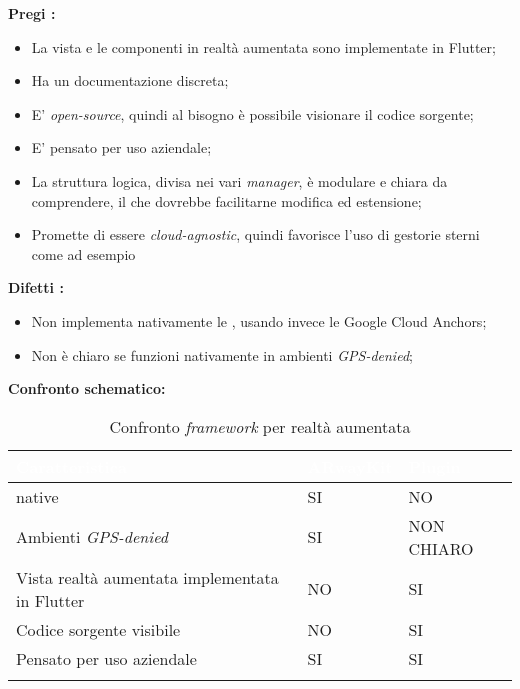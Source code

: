\textbf{Pregi \aplug{}:}
\begin{itemize}
  \item La vista e le componenti in realtà aumentata sono implementate in Flutter;
  \item Ha un documentazione discreta;
  \item E' \textit{open-source}, quindi al bisogno è possibile visionare il codice sorgente;
  \item E' pensato per uso aziendale;
  \item La struttura logica, divisa nei vari \textit{manager}, è modulare e chiara da comprendere, il che dovrebbe facilitarne modifica ed estensione;
  \item Promette di essere \textit{cloud-agnostic}, quindi favorisce l'uso di gestorie sterni come ad esempio \asa{} 
\end{itemize}

\textbf{Difetti \aplug{}:}
\begin{itemize}
  \item Non implementa nativamente le \asa{}, usando invece le Google Cloud Anchors;
  \item Non è chiaro se funzioni nativamente in ambienti \textit{GPS-denied};
\end{itemize}

\textbf{Confronto schematico:}

{
  \setlength{\freewidth}{\dimexpr\textwidth-10\tabcolsep}
  \renewcommand{\arraystretch}{1.5}
  \centering
  \setlength{\aboverulesep}{0pt}
  \setlength{\belowrulesep}{0pt}
  \begin{longtable}{C{.6\freewidth} C{.2\freewidth} C{.2\freewidth}} 
     \toprule 
  \textcolor{white}{\textbf{Caratteristica}} &
  \textcolor{white}{\textbf{ARwayKit}} &
  \textcolor{white}{\textbf{Plugin}}\\
  \midrule
  \endhead
  
  \asa{} native & SI & NO\\
  Ambienti \textit{GPS-denied} & SI & NON CHIARO\\
  Vista realtà aumentata implementata in Flutter & NO & SI\\
  Codice sorgente visibile & NO & SI\\
  Pensato per uso aziendale & SI & SI\\

  \bottomrule
  \caption{Confronto \textit{framework} per realtà aumentata}
  \end{longtable}
}

